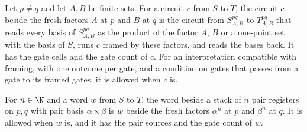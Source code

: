 \begin{definition}
    \label{def:party_lift_pair}
    \leanok
    Let $p\ne q$ and let $A,B$ be finite sets. For a circuit $c$ from $S$ to $T$, the
    circuit $c$ beside the fresh factors $A$ at $p$ and $B$ at $q$ is the circuit
    from $S^{pq}_{A,B}$ to $T^{pq}_{A,B}$ that reads every basis of $S^{pq}_{A,B}$
    as the product of the factor $A$, $B$ or a one-point set with the basis of
    $S$, runs $c$ framed by these factors, and reads the bases back. It has the gate
    cells and the gate count of $c$. For an interpretation compatible with framing,
    with one outcome per gate, and a condition on gates that passes from a gate to
    its framed gates, it is allowed when $c$ is.

    For $n\in\N$ and a word $w$ from $S$ to $T$, the word beside a stack of $n$ pair
    registers on $p,q$ with pair basis $\alpha\times\beta$ is $w$ beside the fresh
    factors $\alpha^n$ at $p$ and $\beta^n$ at $q$. It is allowed when $w$ is, and
    it has the pair sources and the gate count of $w$.
\end{definition}

